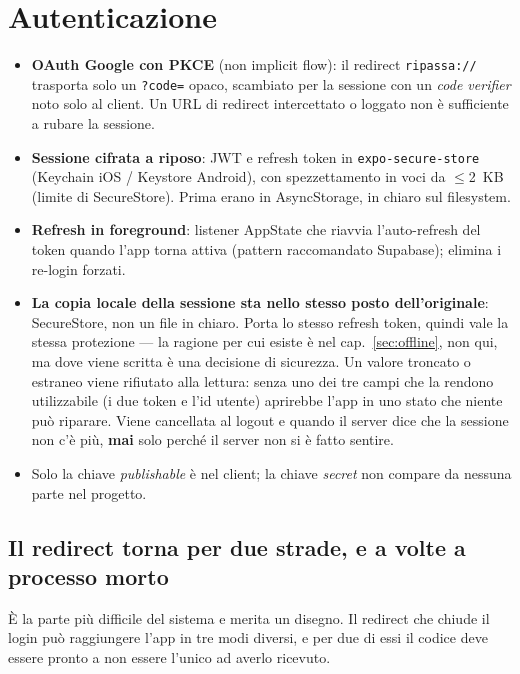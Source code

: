 \documentclass[11pt,a4paper]{report}
\begin{document}
\section{Autenticazione}
\begin{itemize}[nosep]
  \item \textbf{OAuth Google con PKCE} (non implicit flow): il redirect
        \texttt{ripassa://} trasporta solo un \texttt{?code=} opaco, scambiato
        per la sessione con un \emph{code verifier} noto solo al client. Un
        URL di redirect intercettato o loggato non \`e sufficiente a rubare
        la sessione.
  \item \textbf{Sessione cifrata a riposo}: JWT e refresh token in
        \texttt{expo-secure-store} (Keychain iOS / Keystore Android), con
        spezzettamento in voci da $\le$2~KB (limite di SecureStore). Prima
        erano in AsyncStorage, in chiaro sul filesystem.
  \item \textbf{Refresh in foreground}: listener AppState che riavvia
        l'auto-refresh del token quando l'app torna attiva (pattern
        raccomandato Supabase); elimina i re-login forzati.
  \item \textbf{La copia locale della sessione sta nello stesso posto
        dell'originale}: SecureStore, non un file in chiaro. Porta lo stesso
        refresh token, quindi vale la stessa protezione --- la ragione per cui
        esiste \`e nel cap.~\ref{sec:offline}, non qui, ma dove viene scritta
        \`e una decisione di sicurezza. Un valore troncato o estraneo viene
        rifiutato alla lettura: senza uno dei tre campi che la rendono
        utilizzabile (i due token e l'id utente) aprirebbe l'app in uno stato
        che niente pu\`o riparare. Viene cancellata al logout e quando il
        server dice che la sessione non c'\`e pi\`u, \textbf{mai} solo perch\'e
        il server non si \`e fatto sentire.
  \item Solo la chiave \emph{publishable} \`e nel client; la chiave
        \emph{secret} non compare da nessuna parte nel progetto.
\end{itemize}

\subsection*{Il redirect torna per due strade, e a volte a processo morto}

\`E la parte pi\`u difficile del sistema e merita un disegno. Il redirect che
chiude il login pu\`o raggiungere l'app in tre modi diversi, e per due di essi
il codice deve essere pronto a non essere l'unico ad averlo ricevuto.
\end{document}
